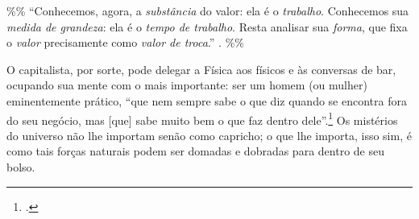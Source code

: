 \documentclass[12pt]{article}
\numberwithin{equation}{section}
\theoremstyle{plain}
\theoremstyle{definition}
\theoremstyle{remark}
\begin{document}
\%\% ``Conhecemos, agora, a \emph{substância} do valor: ela é o \emph{trabalho}. Conhecemos sua \emph{medida de grandeza}: ela é o \emph{tempo de trabalho}. Resta analisar sua \emph{forma}, que fixa o \emph{valor} precisamente como \emph{valor de troca}.'' \parencite[p. 118, n. ***]{Marx2017}. \%\%

O capitalista, por sorte, pode delegar a Física aos físicos e às conversas de bar, ocupando sua mente com o mais importante: ser um homem (ou mulher) eminentemente prático, ``que nem sempre sabe o que diz quando se encontra fora do seu negócio, mas {[}que{]} sabe muito bem o que faz dentro dele''.\footnote{\parencite[p. 269]{Marx2017}.} Os mistérios do universo não lhe importam senão como capricho; o que lhe importa, isso sim, é como tais forças naturais podem ser domadas e dobradas para dentro de seu bolso.

\printbibliography
\end{document}
